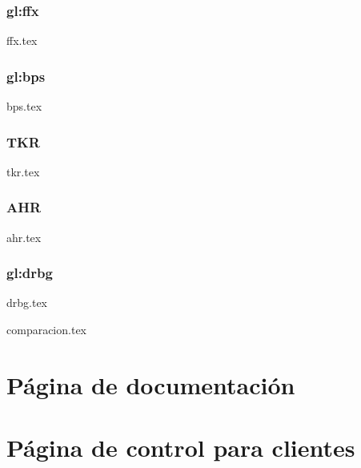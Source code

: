 \subsubsection{\texorpdfstring{\acrshort{gl:ffx}}{FFX}}
{ffx.tex}

\subsubsection{\texorpdfstring{\acrshort{gl:bps}}{BPS}}
{bps.tex}

\subsubsection{TKR}
{tkr.tex}

\subsubsection{AHR}
{ahr.tex}

\subsubsection{\texorpdfstring{\acrshort{gl:drbg}}{DRBG}}
{drbg.tex}

{comparacion.tex}

\section{Página de documentación}

\section{Página de control para clientes}
